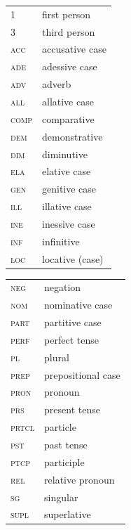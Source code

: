 \documentclass[output=paper,colorlinks,citecolor=brown]{langscibook}
\begin{document}
\begin{tabularx}{.45\textwidth}{lQ}
1 & first person\\
3 & third person\\
\textsc{acc} & accusative case\\
\textsc{ade} & adessive case\\
\textsc{adv} & adverb\\
\textsc{all} & allative case\\
\textsc{comp} & comparative\\
\textsc{dem} & demonstrative\\
\textsc{dim} & diminutive \\
\textsc{ela} & elative case\\
\textsc{gen} & genitive case\\
\textsc{ill} & illative case\\
\textsc{ine} & inessive case\\
\textsc{inf} & infinitive\\
\textsc{loc} & locative (case)\\
\end{tabularx}
\begin{tabularx}{.45\textwidth}{lQ}
\textsc{neg} & negation\\
\textsc{nom} & nominative case\\
\textsc{part} & partitive case\\
\textsc{perf} & perfect tense \\
\textsc{pl} & plural\\
\textsc{prep} & prepositional case\\
\textsc{pron} & pronoun\\
\textsc{prs} & present tense\\
\textsc{prtcl} & particle\\ 
\textsc{pst} & past tense\\
\textsc{ptcp} & participle \\
\textsc{rel} & relative pronoun\\
\textsc{sg} & singular\\
\textsc{supl} & superlative 
\end{tabularx}

\sloppy\printbibliography[heading=subbibliography,notkeyword=this]
\end{document}
